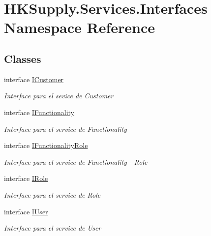 \hypertarget{namespace_h_k_supply_1_1_services_1_1_interfaces}{}\section{H\+K\+Supply.\+Services.\+Interfaces Namespace Reference}
\label{namespace_h_k_supply_1_1_services_1_1_interfaces}
\subsection*{Classes}
\begin{DoxyCompactItemize}
\item 
interface \hyperlink{interface_h_k_supply_1_1_services_1_1_interfaces_1_1_i_customer}{I\+Customer}
\begin{DoxyCompactList}\small\item\em Interface para el sevice de Customer \end{DoxyCompactList}\item 
interface \hyperlink{interface_h_k_supply_1_1_services_1_1_interfaces_1_1_i_functionality}{I\+Functionality}
\begin{DoxyCompactList}\small\item\em Interface para el service de Functionality \end{DoxyCompactList}\item 
interface \hyperlink{interface_h_k_supply_1_1_services_1_1_interfaces_1_1_i_functionality_role}{I\+Functionality\+Role}
\begin{DoxyCompactList}\small\item\em Interface para el service de Functionality -\/ Role \end{DoxyCompactList}\item 
interface \hyperlink{interface_h_k_supply_1_1_services_1_1_interfaces_1_1_i_role}{I\+Role}
\begin{DoxyCompactList}\small\item\em Interface para el service de Role \end{DoxyCompactList}\item 
interface \hyperlink{interface_h_k_supply_1_1_services_1_1_interfaces_1_1_i_user}{I\+User}
\begin{DoxyCompactList}\small\item\em Interface para el service de User \end{DoxyCompactList}\end{DoxyCompactItemize}

